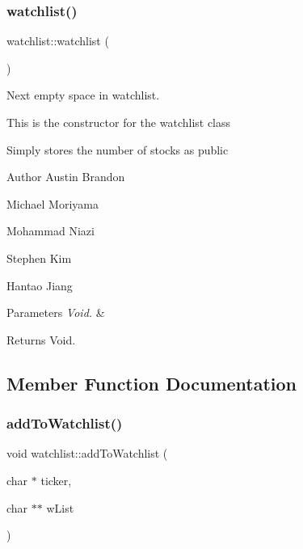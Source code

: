 \subsubsection{\texorpdfstring{watchlist()}{watchlist()}}
{\footnotesize\ttfamily watchlist\+::watchlist (\begin{DoxyParamCaption}{ }\end{DoxyParamCaption})}



Next empty space in watchlist. 

This is the constructor for the watchlist class

Simply stores the number of stocks as public

\begin{DoxyAuthor}{Author}
Austin Brandon 

Michael Moriyama 

Mohammad Niazi 

Stephen Kim 

Hantao Jiang 
\end{DoxyAuthor}

\begin{DoxyParams}{Parameters}
{\em Void.} & \\
\hline
\end{DoxyParams}
\begin{DoxyReturn}{Returns}
Void. 
\end{DoxyReturn}


\subsection{Member Function Documentation}
\mbox{\label{classwatchlist_a889735bbad56c0e0df354fd7a9498d36}} 
\subsubsection{\texorpdfstring{add\+To\+Watchlist()}{addToWatchlist()}}
{\footnotesize\ttfamily void watchlist\+::add\+To\+Watchlist (\begin{DoxyParamCaption}\item[{char $\ast$}]{ticker,  }\item[{char $\ast$$\ast$}]{w\+List }\end{DoxyParamCaption})}




